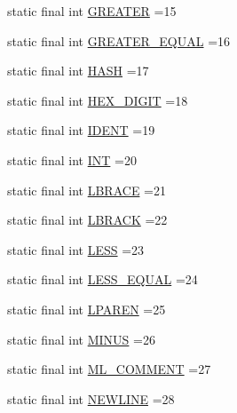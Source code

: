 \begin{DoxyCompactItemize}
\item 
static final int \hyperlink{classorg_1_1tzi_1_1use_1_1parser_1_1use_1_1_u_s_e_lexer_ad608b5a655d8cd85646d1e371810c29f}{G\-R\-E\-A\-T\-E\-R} =15
\item 
static final int \hyperlink{classorg_1_1tzi_1_1use_1_1parser_1_1use_1_1_u_s_e_lexer_af1b1f1b16c15637fce29a0032e91bda2}{G\-R\-E\-A\-T\-E\-R\-\_\-\-E\-Q\-U\-A\-L} =16
\item 
static final int \hyperlink{classorg_1_1tzi_1_1use_1_1parser_1_1use_1_1_u_s_e_lexer_a7e2dcfdaf44e42fc25d9c4932201d0d7}{H\-A\-S\-H} =17
\item 
static final int \hyperlink{classorg_1_1tzi_1_1use_1_1parser_1_1use_1_1_u_s_e_lexer_aecf13771ed6ce7d4577bc05acb0d65cc}{H\-E\-X\-\_\-\-D\-I\-G\-I\-T} =18
\item 
static final int \hyperlink{classorg_1_1tzi_1_1use_1_1parser_1_1use_1_1_u_s_e_lexer_aff72c5313adb10b4d2daf1a75e1512ce}{I\-D\-E\-N\-T} =19
\item 
static final int \hyperlink{classorg_1_1tzi_1_1use_1_1parser_1_1use_1_1_u_s_e_lexer_a72cc7d561586c3960993c11e0914e90a}{I\-N\-T} =20
\item 
static final int \hyperlink{classorg_1_1tzi_1_1use_1_1parser_1_1use_1_1_u_s_e_lexer_abc8144b7eb19ab367387506d10279485}{L\-B\-R\-A\-C\-E} =21
\item 
static final int \hyperlink{classorg_1_1tzi_1_1use_1_1parser_1_1use_1_1_u_s_e_lexer_abb3400bfd23a0fd8808af235aa40a5f1}{L\-B\-R\-A\-C\-K} =22
\item 
static final int \hyperlink{classorg_1_1tzi_1_1use_1_1parser_1_1use_1_1_u_s_e_lexer_a11eb177a907993d8b7597e268e1647cc}{L\-E\-S\-S} =23
\item 
static final int \hyperlink{classorg_1_1tzi_1_1use_1_1parser_1_1use_1_1_u_s_e_lexer_a0c9e08ec342ec1ef1618a95699c1edc8}{L\-E\-S\-S\-\_\-\-E\-Q\-U\-A\-L} =24
\item 
static final int \hyperlink{classorg_1_1tzi_1_1use_1_1parser_1_1use_1_1_u_s_e_lexer_a0824c93f2b250365481bda0562b73013}{L\-P\-A\-R\-E\-N} =25
\item 
static final int \hyperlink{classorg_1_1tzi_1_1use_1_1parser_1_1use_1_1_u_s_e_lexer_af35cb179fdf6298296a3d6b8993fbf47}{M\-I\-N\-U\-S} =26
\item 
static final int \hyperlink{classorg_1_1tzi_1_1use_1_1parser_1_1use_1_1_u_s_e_lexer_ac31b44248e8bcc4822034444095b58bd}{M\-L\-\_\-\-C\-O\-M\-M\-E\-N\-T} =27
\item 
static final int \hyperlink{classorg_1_1tzi_1_1use_1_1parser_1_1use_1_1_u_s_e_lexer_a261956572dcffd1bbcca1803fd3b929a}{N\-E\-W\-L\-I\-N\-E} =28

\end{DoxyCompactItemize}
